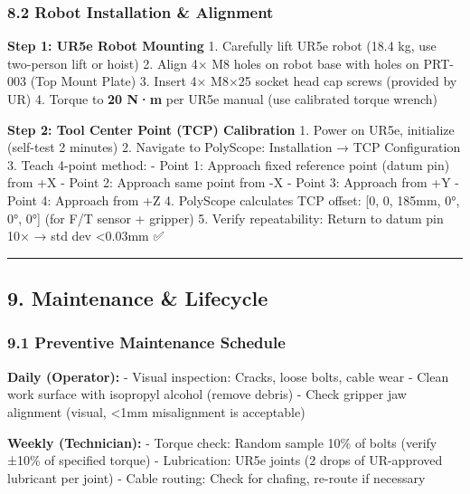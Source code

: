 \documentclass[
]{article}
\begin{document}
\hypertarget{robot-installation-alignment}{%
\subsubsection{8.2 Robot Installation \&
Alignment}\label{robot-installation-alignment}}

\textbf{Step 1: UR5e Robot Mounting} 1. Carefully lift UR5e robot (18.4
kg, use two-person lift or hoist) 2. Align 4× M8 holes on robot base
with holes on PRT-003 (Top Mount Plate) 3. Insert 4× M8×25 socket head
cap screws (provided by UR) 4. Torque to \textbf{20 N·m} per UR5e manual
(use calibrated torque wrench)

\textbf{Step 2: Tool Center Point (TCP) Calibration} 1. Power on UR5e,
initialize (self-test 2 minutes) 2. Navigate to PolyScope: Installation
→ TCP Configuration 3. Teach 4-point method: - Point 1: Approach fixed
reference point (datum pin) from +X - Point 2: Approach same point from
-X - Point 3: Approach from +Y - Point 4: Approach from +Z 4. PolyScope
calculates TCP offset: {[}0, 0, 185mm, 0°, 0°, 0°{]} (for F/T sensor +
gripper) 5. Verify repeatability: Return to datum pin 10× → std dev
\textless0.03mm ✅

\begin{center}\rule{0.5\linewidth}{0.5pt}\end{center}

\hypertarget{maintenance-lifecycle}{%
\subsection{9. Maintenance \& Lifecycle}\label{maintenance-lifecycle}}

\hypertarget{preventive-maintenance-schedule}{%
\subsubsection{9.1 Preventive Maintenance
Schedule}\label{preventive-maintenance-schedule}}

\textbf{Daily (Operator):} - Visual inspection: Cracks, loose bolts,
cable wear - Clean work surface with isopropyl alcohol (remove debris) -
Check gripper jaw alignment (visual, \textless1mm misalignment is
acceptable)

\textbf{Weekly (Technician):} - Torque check: Random sample 10\% of
bolts (verify ±10\% of specified torque) - Lubrication: UR5e joints (2
drops of UR-approved lubricant per joint) - Cable routing: Check for
chafing, re-route if necessary
\end{document}
